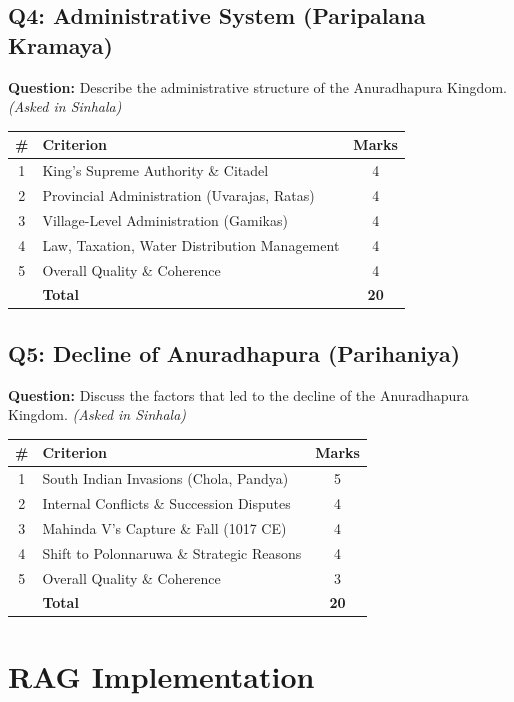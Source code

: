 \documentclass[12pt,a4paper]{article}
\begin{document}
\subsection{Q4: Administrative System (Paripalana Kramaya)}
\textbf{Question:} Describe the administrative structure of the Anuradhapura Kingdom. \textit{(Asked in Sinhala)}

\begin{table}[H]
\centering
\begin{tabular}{clc}
\toprule
\# & Criterion & Marks \\
\midrule
1 & King's Supreme Authority \& Citadel & 4 \\
2 & Provincial Administration (Uvarajas, Ratas) & 4 \\
3 & Village-Level Administration (Gamikas) & 4 \\
4 & Law, Taxation, Water Distribution Management & 4 \\
5 & Overall Quality \& Coherence & 4 \\
\midrule
  & \textbf{Total} & \textbf{20} \\
\bottomrule
\end{tabular}
\end{table}

\subsection{Q5: Decline of Anuradhapura (Parihaniya)}
\textbf{Question:} Discuss the factors that led to the decline of the Anuradhapura Kingdom. \textit{(Asked in Sinhala)}

\begin{table}[H]
\centering
\begin{tabular}{clc}
\toprule
\# & Criterion & Marks \\
\midrule
1 & South Indian Invasions (Chola, Pandya) & 5 \\
2 & Internal Conflicts \& Succession Disputes & 4 \\
3 & Mahinda V's Capture \& Fall (1017 CE) & 4 \\
4 & Shift to Polonnaruwa \& Strategic Reasons & 4 \\
5 & Overall Quality \& Coherence & 3 \\
\midrule
  & \textbf{Total} & \textbf{20} \\
\bottomrule
\end{tabular}
\end{table}

\section{RAG Implementation}
\end{document}

